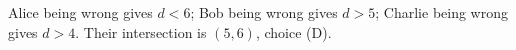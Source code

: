 Alice being wrong gives $d<6$; Bob being wrong gives $d>5$; Charlie being wrong gives $d>4$. Their intersection is $\boxed{(5,6)}$, choice (D).
